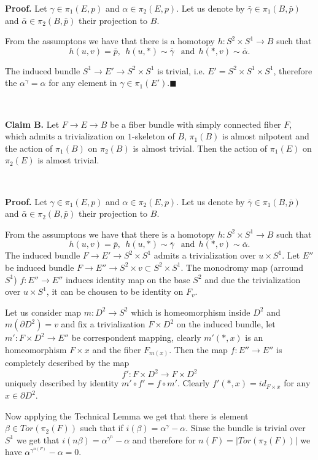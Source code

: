 \documentclass{article}
\def\i{\subset}%
\begin{document}
{\bf Proof.} Let $\gamma\in \pi_1(E,p)$ and $\alpha\in \pi_2(E,p)$. 
Let us denote by $\bar\gamma\in \pi_1(B,\bar p)$ and 
$\bar\alpha\in \pi_2(B,\bar p)$ their projection to $B$.

From the assumptons we have 
that there is a homotopy 
$h:S^2\times S^1\to B$ such that 
$$h(u,v)=\bar p,\ \ 
h(u,*)\sim\bar\gamma\ \ \text{ and}\ \ 
h(*,v)\sim\bar\alpha.$$

The induced bundle $S^1\to E'\to S^2\times S^1$ is trivial, 
i.e. $E'= S^2\times S^1\times S^1$, therefore the $\alpha^\gamma=\alpha$ 
for any element in $\gamma\in \pi_1(E')$.$\blacksquare$



\ 

{\bf Claim B.} Let $F\to E\to B$ be a fiber bundle with 
simply connected fiber $F$, which admits a trivialization on $1$-skeleton of $B$, $\pi_1(B)$ is almost nilpotent 
and the action of $\pi_1(B)$ on $\pi_2(B)$ is almost trivial. 
Then  the action of $\pi_1(E)$ on $\pi_2(E)$ is almost trivial.

\ 

{\bf Proof.} Let $\gamma\in \pi_1(E,p)$ and $\alpha\in \pi_2(E,p)$. 
Let us denote by $\bar\gamma\in \pi_1(B,\bar p)$ and 
$\bar\alpha\in \pi_2(B,\bar p)$ their projection to $B$.

From the assumptons we have 
that there is a homotopy 
$h:S^2\times S^1\to B$ such that 
$$h(u,v)=\bar p,\ \ 
h(u,*)\sim\bar\gamma\ \ \text{ and}\ \ 
h(*,v)\sim\bar\alpha.$$
The induced bundle $F\to E'\to S^2\times S^1$ admits a 
trivialization over $u\times S^1$.
Let $E''$ be induced bundle $F\to E''\to S^2\times v\i S^2\times S^1$.
The  monodromy map (arround $S^1$) $f:E''\to E''$
induces identity map on the base $S^2$ 
and due the trivialization over $u\times S^1$,
it  can be chousen to be identity on $F_v$.

Let us consider map $m:D^2\to S^2$ which is homeomorphism 
inside $D^2$ and $m(\partial D^2)=v$ and fix a trivialization 
$F\times D^2$ on the induced bundle, let 
$m':F\times D^2\to E''$ be correspondent mapping, clearly 
$m'(*,x)$ is an homeomorphism $F\times x$ and the fiber $F_{m(x)}$.
Then the map $f:E''\to E''$ is completely described by the map 
$$f':F\times D^2\to F\times D^2 $$ uniquely described by identity
$m'\circ f'=f\circ m'$. Clearly $f'(*,x)=id_{F\times x}$ 
for any $x\in\partial D^2$.

Now applying the Technical Lemma we get that there is element 
$\beta\in Tor(\pi_2(F))$ such that if $i(\beta)=\alpha^\gamma-\alpha$.
Sinse the bundle is trivial over $S^1$ we get that 
$i(n\beta)=\alpha^{\gamma^n}-\alpha$ and therefore for $n(F)=|Tor(\pi_2(F))|$ we have 
$\alpha^{\gamma^{n(F)}}-\alpha=0$. 
\end{document}
